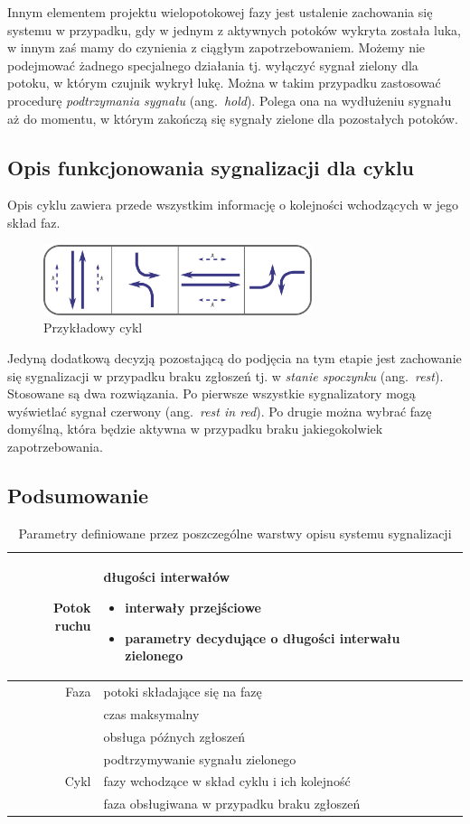 \documentclass{pracamgr}
\newcommand{\ang}[1]{(ang.~\emph{#1})}
\begin{document}
Innym elementem projektu wielopotokowej fazy jest ustalenie zachowania
się systemu w przypadku, gdy w jednym z aktywnych potoków wykryta
została luka, w innym zaś mamy do czynienia z ciągłym
zapotrzebowaniem. Możemy nie podejmować żadnego specjalnego działania
tj. wyłączyć sygnał zielony dla potoku, w którym czujnik wykrył lukę.
Można w takim przypadku zastosować procedurę \emph{podtrzymania
  sygnału} \ang{hold}. Polega ona na wydłużeniu sygnału aż do momentu,
w którym zakończą się sygnały zielone dla pozostałych potoków.

\subsection{Opis funkcjonowania sygnalizacji dla cyklu}
Opis cyklu zawiera przede wszystkim informację o kolejności
wchodzących w jego skład faz.
\begin{figure}[h]
  \centering
  \includegraphics[width=0.7\textwidth]{img/signals-cycle-example}
  \caption{Przykładowy cykl}
\end{figure}

Jedyną dodatkową decyzją pozostającą do podjęcia na tym etapie jest
zachowanie się sygnalizacji w przypadku braku zgłoszeń tj. w
\emph{stanie spoczynku} \ang{rest}. Stosowane są dwa rozwiązania. Po
pierwsze wszystkie sygnalizatory mogą wyświetlać sygnał czerwony
\ang{rest in red}. Po drugie można wybrać fazę domyślną, która będzie
aktywna w przypadku braku jakiegokolwiek zapotrzebowania.

\subsection{Podsumowanie}
\begin{table}[ht]
  \centering
  \caption{Parametry definiowane przez poszczególne warstwy opisu systemu sygnalizacji}
  \begin{tabular}{|r|p{8cm}|}
    \hline
    Potok ruchu & długości interwałów
    \begin{itemize}
      \item interwały przejściowe
      \item parametry decydujące o długości interwału zielonego
    \end{itemize} \\\hline
    Faza & potoki składające się na fazę  \\
    & czas maksymalny \\
    & obsługa późnych zgłoszeń \\
    & podtrzymywanie sygnału zielonego \\\hline
    Cykl & fazy wchodzące w skład cyklu i ich kolejność \\
    & faza obsługiwana w przypadku braku zgłoszeń \\\hline
  \end{tabular}
\end{table}
\end{document}
